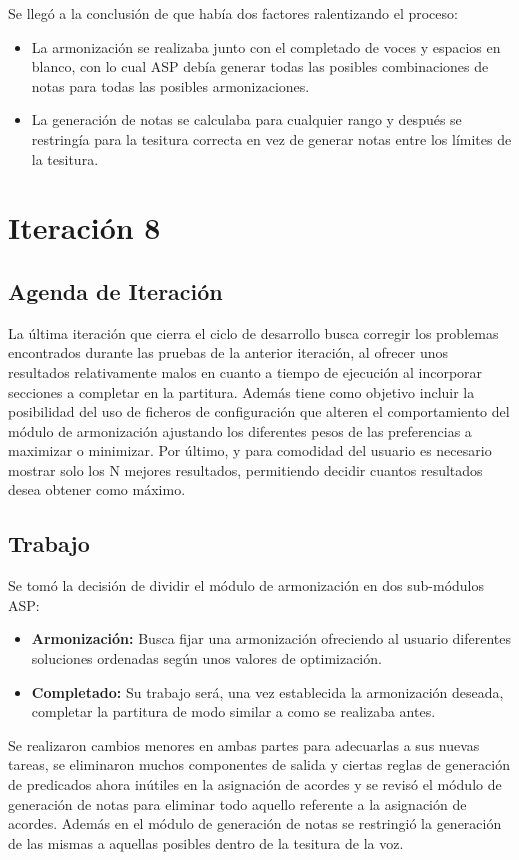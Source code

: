 Se llegó a la conclusión de que había dos factores ralentizando el proceso:
\begin{itemize}
	\item La armonización se realizaba junto con el completado de voces y espacios en blanco, con lo cual ASP debía generar todas las posibles combinaciones de notas para todas las posibles armonizaciones.
	\item La generación de notas se calculaba para cualquier rango y después se restringía para la tesitura correcta en vez de generar notas entre los límites de la tesitura. 
\end{itemize}

\section{Iteración 8}
\subsection{Agenda de Iteración}
La última iteración que cierra el ciclo de desarrollo busca corregir los problemas encontrados durante las pruebas de la anterior iteración, al ofrecer unos resultados relativamente malos en cuanto a tiempo de ejecución al incorporar secciones a completar en la partitura. Además tiene como objetivo incluir la posibilidad del uso de ficheros de configuración que alteren el comportamiento del módulo de armonización ajustando los diferentes pesos de las preferencias a maximizar o minimizar. Por último, y para comodidad del usuario es necesario mostrar solo los N mejores resultados, permitiendo decidir cuantos resultados desea obtener como máximo.

\subsection{Trabajo}
Se tomó la decisión de dividir el módulo de armonización en dos sub-módulos ASP:
\begin{itemize}
	\item \textbf{Armonización:} Busca fijar una armonización ofreciendo al usuario diferentes soluciones ordenadas según unos valores de optimización.
	\item \textbf{Completado:} Su trabajo será, una vez establecida la armonización deseada, completar la partitura de modo similar a como se realizaba antes.
\end{itemize}

Se realizaron cambios menores en ambas partes para adecuarlas a sus nuevas tareas, se eliminaron muchos componentes de salida y ciertas reglas de generación de predicados ahora inútiles en la asignación de acordes y se revisó el módulo de generación de notas para eliminar todo aquello referente a la asignación de acordes. Además en el módulo de generación de notas se restringió la generación de las mismas a aquellas posibles dentro de la tesitura de la voz.

